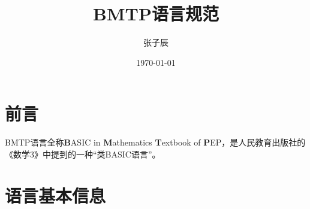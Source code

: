\documentclass[11pt]{ctexrep}
\begin{document}
\title{BMTP语言规范}
\author{张子辰}
\date{\today}
\maketitle
\tableofcontents
\chapter{前言}

BMTP语言全称\textbf{B}ASIC in \textbf{M}athematics \textbf{T}extbook of \textbf{P}EP，是人民教育出版社的《数学3》中提到的一种“类BASIC语言”。

\chapter{语言基本信息}
\end{document}
